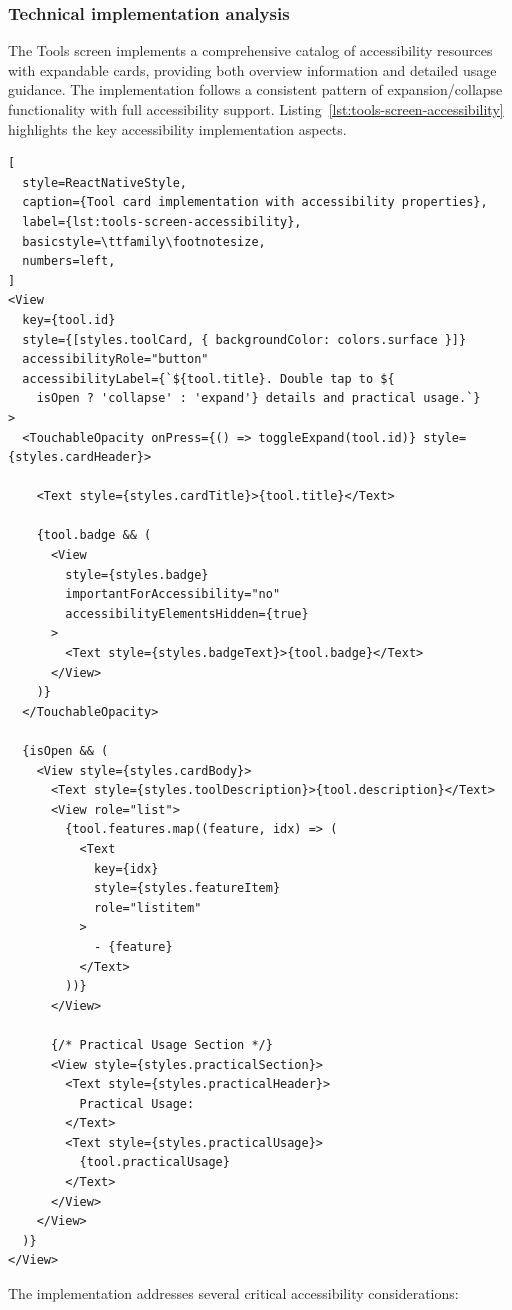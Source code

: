 \subsubsection{Technical implementation analysis}

The Tools screen implements a comprehensive catalog of accessibility resources with expandable cards, providing both overview information and detailed usage guidance. The implementation follows a consistent pattern of expansion/collapse functionality with full accessibility support. Listing~\ref{lst:tools-screen-accessibility} highlights the key accessibility implementation aspects.

\begin{lstlisting}[
  style=ReactNativeStyle,
  caption={Tool card implementation with accessibility properties},
  label={lst:tools-screen-accessibility},
  basicstyle=\ttfamily\footnotesize,
  numbers=left,
]
<View
  key={tool.id}
  style={[styles.toolCard, { backgroundColor: colors.surface }]}
  accessibilityRole="button"
  accessibilityLabel={`${tool.title}. Double tap to ${
    isOpen ? 'collapse' : 'expand'} details and practical usage.`}
>
  <TouchableOpacity onPress={() => toggleExpand(tool.id)} style={styles.cardHeader}>
    
    <Text style={styles.cardTitle}>{tool.title}</Text>
    
    {tool.badge && (
      <View 
        style={styles.badge} 
        importantForAccessibility="no" 
        accessibilityElementsHidden={true}
      >
        <Text style={styles.badgeText}>{tool.badge}</Text>
      </View>
    )}
  </TouchableOpacity>

  {isOpen && (
    <View style={styles.cardBody}>
      <Text style={styles.toolDescription}>{tool.description}</Text>
      <View role="list">
        {tool.features.map((feature, idx) => (
          <Text 
            key={idx} 
            style={styles.featureItem} 
            role="listitem"
          >
            - {feature}
          </Text>
        ))}
      </View>
      
      {/* Practical Usage Section */}
      <View style={styles.practicalSection}>
        <Text style={styles.practicalHeader}>
          Practical Usage:
        </Text>
        <Text style={styles.practicalUsage}>
          {tool.practicalUsage}
        </Text>
      </View>
    </View>
  )}
</View>
\end{lstlisting}
\FloatBarrier

The implementation addresses several critical accessibility considerations:

